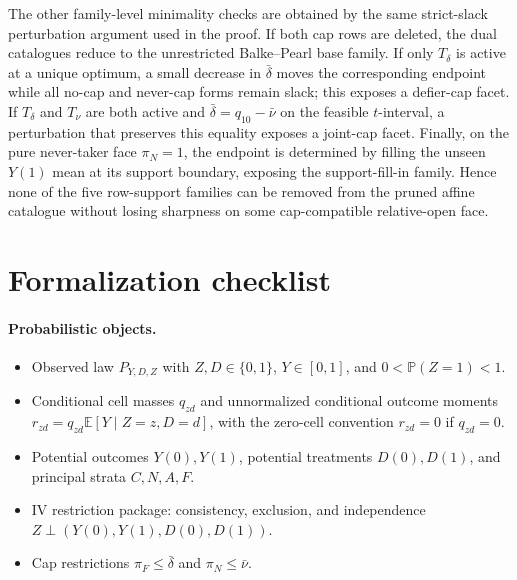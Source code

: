 \documentclass[11pt]{article}
\newcommand{\E}{\mathbb{E}}
\renewcommand{\Pr}{\mathbb{P}}
\theoremstyle{definition}
\theoremstyle{plain}
\theoremstyle{remark}
\begin{document}
The other family-level minimality checks are obtained by the same strict-slack
perturbation argument used in the proof.  If both cap rows are deleted, the
dual catalogues reduce to the unrestricted Balke--Pearl base family.  If only
\(T_\delta\) is active at a unique optimum, a small decrease in
\(\bar\delta\) moves the corresponding endpoint while all no-cap and
never-cap forms remain slack; this exposes a defier-cap facet.  If
\(T_\delta\) and \(T_\nu\) are both active and
\(\bar\delta=q_{10}-\bar\nu\) on the feasible \(t\)-interval, a perturbation
that preserves this equality exposes a joint-cap facet.  Finally, on the pure
never-taker face \(\pi_N=1\), the endpoint is determined by filling the
unseen \(Y(1)\) mean at its support boundary, exposing the support-fill-in
family.  Hence none of the five row-support families can be removed from the
pruned affine catalogue without losing sharpness on some cap-compatible
relative-open face.

\section{Formalization checklist}
\paragraph{Probabilistic objects.}
\begin{itemize}[leftmargin=*]
\item Observed law \(P_{Y,D,Z}\) with \(Z,D\in\{0,1\}\), \(Y\in[0,1]\), and
\(0<\Pr(Z=1)<1\).
\item Conditional cell masses \(q_{zd}\) and unnormalized conditional outcome
moments \(r_{zd}=q_{zd}\E[Y\mid Z=z,D=d]\), with the zero-cell convention
\(r_{zd}=0\) if \(q_{zd}=0\).
\item Potential outcomes \(Y(0),Y(1)\), potential treatments \(D(0),D(1)\),
and principal strata \(C,N,A,F\).
\item IV restriction package: consistency, exclusion, and independence
\(Z\perp(Y(0),Y(1),D(0),D(1))\).
\item Cap restrictions \(\pi_F\le\bar\delta\) and \(\pi_N\le\bar\nu\).
\end{itemize}
\end{document}
